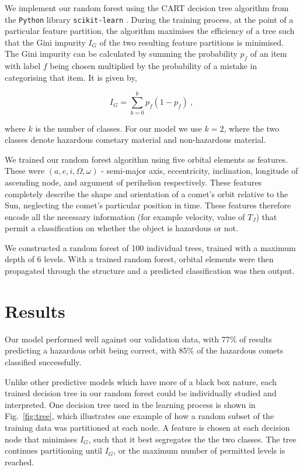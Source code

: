 We implement our random forest using the \textsc{CART} decision tree algorithm \citep{breiman2017classification} from the \texttt{Python} library \texttt{scikit-learn} \citep{cournapeau2015sci}. During the training process, at the point of a particular feature partition, the algorithm maximises the efficiency of a tree such that the Gini impurity $I_G$ of the two resulting feature partitions is minimised. The Gini impurity can be calculated by summing the probability $p_f$ of an item with label $f$  being chosen multiplied by the probability of a mistake in categorising that item.  It is given by,

\vspace{-1ex}
\begin{equation}
   I_G =  \sum_{k = 0}^k p_f(1-p_f)~,
\end{equation}

where $k$ is the number of classes. For our model we use $k=2$, where the two classes denote hazardous cometary material and non-hazardous material. 

We trained our random forest algorithm using five orbital elements as features. These were $(a,e,i,\Omega,\omega)$ - semi-major axis, eccentricity, inclination, longitude of ascending node, and argument of perihelion respectively. These features completely describe the shape and orientation of a comet's orbit relative to the Sun, neglecting the comet's particular position in time. These features therefore encode all the necessary information (for example velocity, value of $T_J$) that permit a classification on whether the object is hazardous or not.

We constructed a random forest of 100 individual trees, trained with a maximum depth of 6 levels. With a trained random forest, orbital elements were then propagated through the structure and a predicted classification was then output.

\section{Results}

Our model performed well against our validation data, with 77\% of results predicting a hazardous orbit being correct, with 85\% of the hazardous comets classified successfully.

Unlike other predictive models which have more of a black box nature, each trained decision tree in our random forest could be individually studied and interpreted. One decision tree used in the learning process is shown in Fig.~\ref{fig:tree}, which illustrates one example of how a random subset of the training data was partitioned at each node. A feature is chosen at each decision node that minimises $I_G$, such that it best segregates the the two classes. The tree continues partitioning until $I_G$, or the maximum number of permitted levels is reached.

